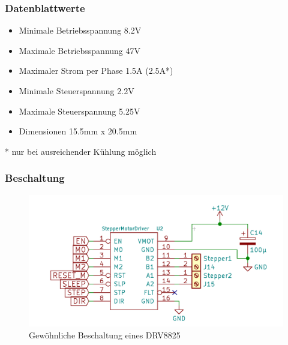 \subsubsection{Datenblattwerte}

\begin{itemize}
    \item Minimale Betriebsspannung 8.2V
    \item Maximale Betriebsspannung 47V
    \item Maximaler Strom per Phase 1.5A (2.5A*)
    \item Minimale Steuerspannung 2.2V
    \item Maximale Steuerspannung 5.25V
    \item Dimensionen 15.5mm x 20.5mm
\end{itemize}
* nur bei ausreichender Kühlung möglich

\subsubsection{Beschaltung}
\begin{figure}[h]
    \centering
    \includegraphics[scale=0.5,page=1]{fig/elektro/StepperMotorDriver.pdf}
    \caption{Gewöhnliche Beschaltung eines DRV8825}
\end{figure}



